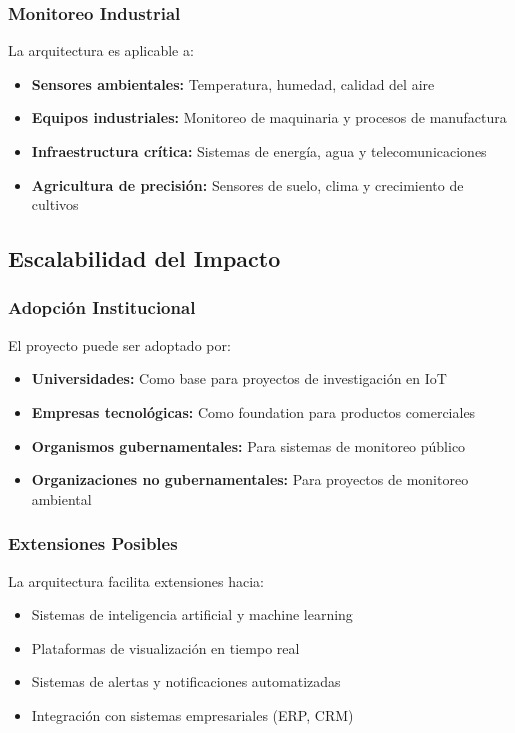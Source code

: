 \subsubsection{Monitoreo Industrial}
La arquitectura es aplicable a:
\begin{itemize}
    \item \textbf{Sensores ambientales:} Temperatura, humedad, calidad del aire
    \item \textbf{Equipos industriales:} Monitoreo de maquinaria y procesos de manufactura
    \item \textbf{Infraestructura crítica:} Sistemas de energía, agua y telecomunicaciones
    \item \textbf{Agricultura de precisión:} Sensores de suelo, clima y crecimiento de cultivos
\end{itemize}

\subsection{Escalabilidad del Impacto}

\subsubsection{Adopción Institucional}
El proyecto puede ser adoptado por:
\begin{itemize}
    \item \textbf{Universidades:} Como base para proyectos de investigación en IoT
    \item \textbf{Empresas tecnológicas:} Como foundation para productos comerciales
    \item \textbf{Organismos gubernamentales:} Para sistemas de monitoreo público
    \item \textbf{Organizaciones no gubernamentales:} Para proyectos de monitoreo ambiental
\end{itemize}

\subsubsection{Extensiones Posibles}
La arquitectura facilita extensiones hacia:
\begin{itemize}
    \item Sistemas de inteligencia artificial y machine learning
    \item Plataformas de visualización en tiempo real
    \item Sistemas de alertas y notificaciones automatizadas
    \item Integración con sistemas empresariales (ERP, CRM)
\end{itemize}

